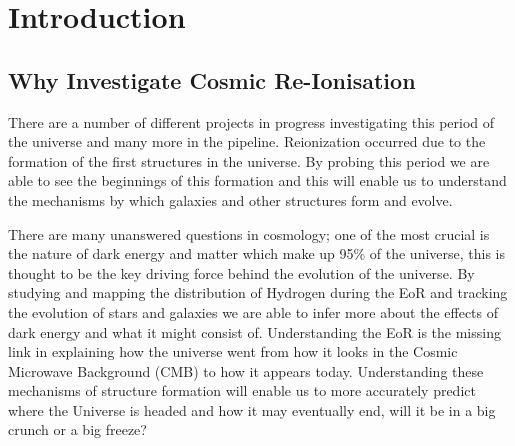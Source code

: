 
\section{Introduction} %
\label{sec:introduction}
    \subsection{Why Investigate Cosmic Re-Ionisation} %
    \label{sub:why_investigate_cosmic_re_ionisation}
    There are a number of different projects in progress investigating this period of the universe and many more in the pipeline. Reionization occurred due to the formation of the first structures in the universe. By probing this period we are able to see the beginnings of this formation and this will enable us to understand the mechanisms by which galaxies and other structures form and evolve.
 
    There are many unanswered questions in cosmology; one of the most crucial is the nature of dark energy and matter which make up 95\% of the universe\cite{WMAP9}, this is thought to be the key driving force behind the evolution of the universe. By studying and mapping the distribution of Hydrogen during the EoR and tracking the evolution of stars and galaxies we are able to infer more about the effects of dark energy and what it might consist of. Understanding the EoR is the missing link in explaining how the universe went from how it looks in the Cosmic Microwave Background (CMB) to how it appears today. Understanding these mechanisms of structure formation will enable us to more accurately predict where the Universe is headed and how it may eventually end, will it be in a big crunch or a big freeze?
